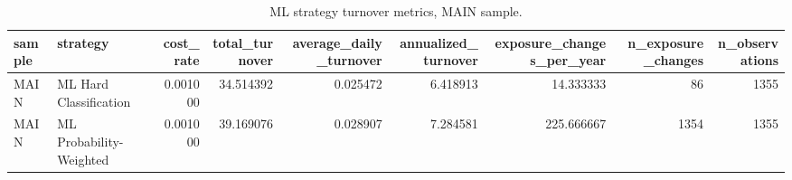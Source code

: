 \begin{table}
\caption{ML strategy turnover metrics, MAIN sample.}
\label{tab:ml_turnover_metrics_main}
\begin{tabular}{llrrrrrrr}
\toprule
sample & strategy & cost_rate & total_turnover & average_daily_turnover & annualized_turnover & exposure_changes_per_year & n_exposure_changes & n_observations \\
\midrule
MAIN & ML Hard Classification & 0.001000 & 34.514392 & 0.025472 & 6.418913 & 14.333333 & 86 & 1355 \\
MAIN & ML Probability-Weighted & 0.001000 & 39.169076 & 0.028907 & 7.284581 & 225.666667 & 1354 & 1355 \\
\bottomrule
\end{tabular}
\end{table}
